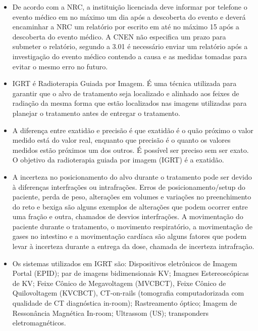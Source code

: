 \documentclass[11pt,a4paper]{article}
\newcounter{exemplo}
\begin{document}
\begin{exemplo}[11. Qualidade ]
\begin{itemize}
        \item De acordo com a NRC, a instituição licenciada deve informar por telefone o evento médico em no máximo um dia após a descoberta do evento e deverá encaminhar a NRC um relatório por escrito em até no máximo 15 após a descoberta do evento médico. A CNEN não especifica um prazo para submeter o relatório, segundo a 3.01 é necessário enviar um relatório após a investigação do evento médico contendo a causa e as medidas tomadas para evitar o mesmo erro no futuro. 

    \end{itemize}
    
\end{exemplo}

\begin{exemplo}[12. IGRT ]

    \begin{itemize}
        \item IGRT é Radioterapia Guiada por Imagem. É uma técnica utilizada para garantir que o alvo de tratamento seja localizado e alinhado aos feixes de radiação da mesma forma que estão localizados nas imagens utilizadas para planejar o tratamento antes de entregar o tratamento.
        
        \item A diferença entre exatidão e precisão é que exatidão é o quão próximo o valor medido está do valor real, enquanto que precisão é o quanto os valores medidos estão próximos um dos outros. É possível ser preciso sem ser exato. O objetivo da radioterapia guiada por imagem (IGRT) é a exatidão.
        
        \item A incerteza no posicionamento do alvo durante o tratamento pode ser devido à diferenças interfrações ou intrafrações. Erros de posicionamento/setup do paciente, perda de peso, alterações em volumes e variações no preenchimento do reto e bexiga são alguns exemplos de alterações que podem ocorrer entre uma fração e outra, chamados de desvios interfrações. A movimentação do paciente durante o tratamento, o movimento respiratório, a movimentação de gases no intestino e a movimentação cardíaca são alguns fatores que podem levar à incerteza durante a entrega da dose, chamada de incerteza intrafração.
        
        \item Os sistemas utilizados em IGRT são: Dispositivos eletrônicos de Imagem Portal (EPID); par de imagens bidimensionais KV; Imagnes Estereoscópicas de KV; Feixe Cônico de Megavoltagem (MVCBCT), Feixe Cônico de Quilovoltagem (KVCBCT), CT-on-rails (tomografia computadorizada com qualidade de CT diagnóstica in-room); Rastreamento óptico; Imagem de Ressonância Magnética In-room; Ultrassom (US); transponders eletromagnéticos.
        

\end{itemize}
\end{exemplo}
\end{document}
